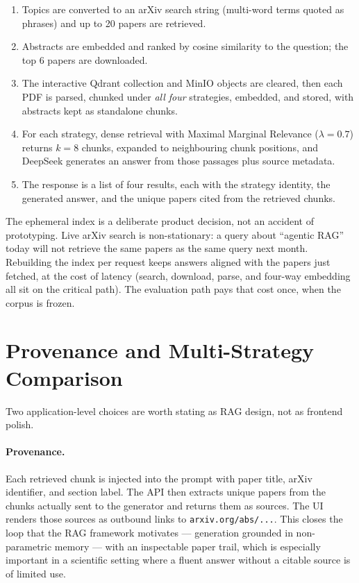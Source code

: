 \documentclass[12pt,a4paper,titlepage,oneside]{book}
\begin{document}
\begin{enumerate}
    \item Topics are converted to an arXiv search string (multi-word terms quoted as phrases) and up to 20 papers are retrieved.
    \item Abstracts are embedded and ranked by cosine similarity to the question; the top 6 papers are downloaded.
    \item The interactive Qdrant collection and MinIO objects are cleared, then each PDF is parsed, chunked under \emph{all four} strategies, embedded, and stored, with abstracts kept as standalone chunks.
    \item For each strategy, dense retrieval with Maximal Marginal Relevance ($\lambda=0.7$) returns $k=8$ chunks, expanded to neighbouring chunk positions, and DeepSeek generates an answer from those passages plus source metadata.
    \item The response is a list of four results, each with the strategy identity, the generated answer, and the unique papers cited from the retrieved chunks.
\end{enumerate}

The ephemeral index is a deliberate product decision, not an accident of prototyping. Live arXiv search is non-stationary: a query about ``agentic RAG'' today will not retrieve the same papers as the same query next month. Rebuilding the index per request keeps answers aligned with the papers just fetched, at the cost of latency (search, download, parse, and four-way embedding all sit on the critical path). The evaluation path pays that cost once, when the corpus is frozen.

\section{Provenance and Multi-Strategy Comparison}

Two application-level choices are worth stating as RAG design, not as frontend polish.

\paragraph{Provenance.} Each retrieved chunk is injected into the prompt with paper title, arXiv identifier, and section label. The API then extracts unique papers from the chunks actually sent to the generator and returns them as sources. The UI renders those sources as outbound links to \texttt{arxiv.org/abs/...}. This closes the loop that the RAG framework motivates \cite{lewis2020rag} --- generation grounded in non-parametric memory --- with an inspectable paper trail, which is especially important in a scientific setting where a fluent answer without a citable source is of limited use.
\end{document}
